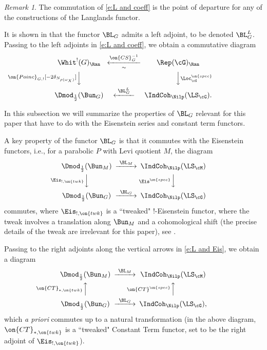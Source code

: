 \documentclass[9pt]{amsart}
\theoremstyle{remark}
\newtheorem{rem}[subsubsection]{Remark}
\theoremstyle{definition}
\theoremstyle{remark}
\numberwithin{equation}{section}
\begin{document}
\begin{rem}

The commutation of \eqref{e:L and coeff} is the point of departure for any of the constructions of the 
Langlands functor. 

\end{rem} 

\sssec{}

It is shown in \cite[Theorem 16.1.2]{GLC3} that the functor $\BL_G$ admits a left adjoint, to be denoted $\BL_G^L$.
Passing to the left adjoints in \eqref{e:L and coeff}, we obtain a commutative diagram
\begin{equation} \label{e:LL and Poinc}
\CD
\Whit^!(G)_\Ran @<{\on{CS}^{-1}_G}<{\sim}<  \Rep(\cG)_\Ran \\
@V{\on{Poinc}_{G,!}[-2\delta_{N_{\rho(\omega_X)}}]}VV @VV{\Loc^{\on{spec}}_\cG}V \\
\Dmod_{\frac{1}{2}}(\Bun_G) @<{\BL_G^L}<<  \IndCoh_\Nilp(\LS_\cG).
\endCD
\end{equation} 




In this subsection we will summarize the properties of $\BL_G$ relevant for this paper that have to do with the
Eisenstein series and constant term functors. 

\sssec{}

A key property of the functor $\BL_G$ is that it commutes with the Eisenstein functors, i.e., for a parabolic $P$
with Levi quotient $M$, the diagram
\begin{equation} \label{e:L and Eis}
\CD
\Dmod_{\frac{1}{2}}(\Bun_M) @>{\BL_M}>>  \IndCoh_\Nilp(\LS_\cM) \\
@V{\Eis_{!,\on{twk}}}VV @V{\Eis^{\on{spec}}}VV \\
\Dmod_{\frac{1}{2}}(\Bun_G) @>{\BL_G}>> \IndCoh_\Nilp(\LS_\cG)
\endCD
\end{equation} 
commutes, where $\Eis_{!,\on{twk}}$ is a ``tweaked" !-Eisenstein functor, where the 
tweak involves a translation along $\Bun_M$ and a cohomological shift (the precise
details of the tweak are irrelevant for this paper), see \cite[Theorem 14.2.2]{GLC3}. 

\sssec{}

Passing to the right adjoints along the vertical arrows in \eqref{e:L and Eis}, we obtain 
a diagram
\begin{equation} \label{e:L and CT}
\CD
\Dmod_{\frac{1}{2}}(\Bun_M) @>{\BL_M}>>  \IndCoh_\Nilp(\LS_\cM)   \\
@A{\on{CT}_{*,\on{twk}}}AA @A{\on{CT}^{\on{spec}}}AA \\
\Dmod_{\frac{1}{2}}(\Bun_G) @>{\BL_G}>> \IndCoh_\Nilp(\LS_\cG),
\endCD
\end{equation} 
which \emph{a priori} commutes up to a natural transformation (in the above diagram, 
$\on{CT}_{*,\on{twk}}$ is a ``tweaked" Constant Term functor, set to be the right adjoint of
$\Eis_{!,\on{twk}}$).
\end{document}
